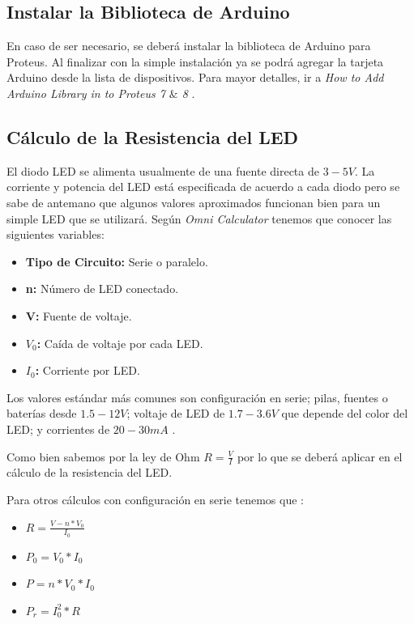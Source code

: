 \documentclass{article}
\begin{document}
    \subsection{Instalar la Biblioteca de Arduino}

    En caso de ser necesario, se deberá instalar la biblioteca de Arduino
    para Proteus. Al finalizar con la simple instalación ya se podrá agregar
    la tarjeta Arduino desde la lista de dispositivos. Para mayor detalles,
    ir a \textit{How to Add Arduino Library in to Proteus 7 $\&$ 8}
    \cite{instructables-2018}.

    \subsection{Cálculo de la Resistencia del LED}

    El diodo LED se alimenta usualmente de una fuente directa de $3-5V$. La
    corriente y potencia del LED está especificada de acuerdo a cada diodo
    pero se sabe de antemano que algunos valores aproximados funcionan bien
    para un simple LED que se utilizará. Según \textit{Omni Calculator}
    \cite{szyk-2022} tenemos que conocer las siguientes variables:

    \begin{itemize}
        \item \textbf{Tipo de Circuito:} Serie o paralelo.
        \item \textbf{n:} Número de LED conectado.
        \item \textbf{V:} Fuente de voltaje.
        \item \textbf{$V_0$:} Caída de voltaje por cada LED\@.
        \item \textbf{$I_0$:} Corriente por LED\@.
    \end{itemize}

    Los valores estándar más comunes son configuración en serie; pilas,
    fuentes o baterías desde $1.5-12V$; voltaje de LED de $1.7-3.6V$ que
    depende del color del LED; y corrientes de $20-30mA$ \cite{szyk-2022}.

    \bigbreak

    Como bien sabemos por la ley de Ohm $R = \frac{V}{I}$ por lo que se
    deberá aplicar en el cálculo de la resistencia del LED\@.

    \bigbreak

    Para otros cálculos con configuración en serie tenemos que \cite{szyk-2022}:

    \begin{itemize}
        \item $R = \frac{V - n*V_0}{I_0}$
        \item $P_0 = V_0 * I_0$
        \item $P = n * V_0 * I_0$
        \item $P_r = I_0^2 * R$
    \end{itemize}
\end{document}
